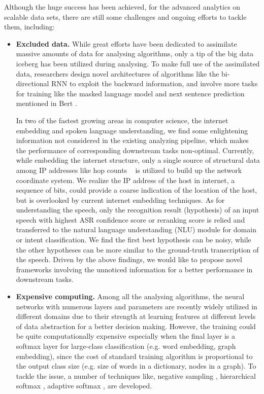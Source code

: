 \documentclass [PhD] {uclathes}
\begin{document}
Although the huge success has been achieved, for the advanced analytics on scalable data sets, there are still some challenges and ongoing efforts to tackle them, including:
\begin{itemize}
	
	\item \textbf{Excluded data.} While great efforts have been dedicated to assimilate massive amounts of data for analysing algorithms, only a tip of the big data iceberg has been utilized during analysing. 
	To make full use of the assimilated data, researchers design novel architectures of algorithms like the bi-directional RNN \citep{graves2013speech} to exploit the backward information, and involve more tasks for training like the masked language model and next sentence prediction mentioned in Bert \citep{devlin2018bert}.
	
	In two of the fastest growing areas in  computer science, the internet embedding and spoken language understanding, we find some enlightening information not considered in the existing analyzing pipeline, which makes  the performance of corresponding downstream tasks non-optimal. Currently, while embedding the internet structure,  only a single source of structural data among IP addresses like hop counts ~\citep{barford-sigcomm,barford-infocom} is utilized to build up the network coordinate system. We realize the IP address of the host in internet, a sequence of bits, could provide a coarse indication of the location of the host, but is overlooked by current internet embedding techniques. As for understanding the speech, only the recognition result (hypothesis) of an input speech with highest ASR confidence score \citep{tur2011spoken} or reranking score \citep{peng2013search, morbini2012reranking} is relied and transferred to the natural language understanding (NLU) module for domain or intent classification.  We find the first best hypothesis can be noisy, while the other hypotheses can be more similar to the  ground-truth transcription of the speech. Driven by the above findings, we would like to propose novel frameworks involving the unnoticed information for a better performance in downstream tasks. 
	
	\item \textbf{Expensive computing.} Among all the analysing algorithms, the neural networks with numerous layers and parameters are recently widely utilized  in different domains due to their strength at learning features at different levels of data abstraction for a better decision making. However, the training could be quite computationally expensive especially when the final layer is a softmax layer for large-class classification (e.g. word embedding, graph embedding), since the cost of standard training algorithm  is proportional to the output class size (e.g. size of words in a dictionary, nodes in a graph).  To tackle the issue, a number of techniques like, negative sampling \citep{mikolov2013efficient}, hierarchical  softmax \citep{morin2005hierarchical}, adaptive softmax \citep{bengio2008adaptive,rawat2019sampled} , are developed.
	

\end{itemize}
\end{document}
